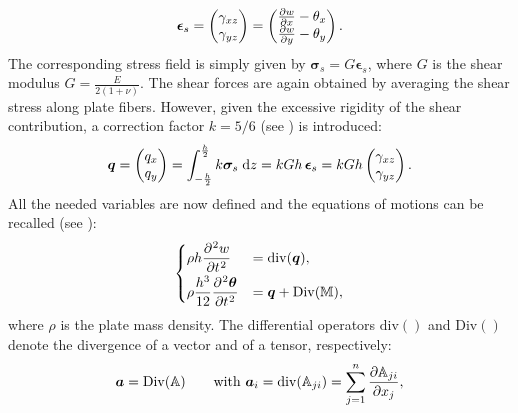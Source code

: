 \documentclass[11t]{article}
\begin{document}
{		\begin{equation}	
		\bm{\epsilon}_s = 
		\begin{pmatrix}
		\gamma_{xz} \\
		\gamma_{yz} \\
		\end{pmatrix} = 
		\begin{pmatrix}
		\diffp{w}{x} - \theta_x \\
		\diffp{w}{y} - \theta_y \\
		\end{pmatrix}.
		\end{equation}
		The corresponding stress field is simply given by $\bm\sigma_s = G \bm{\epsilon}_s$, where $G$ is the shear modulus $G = \frac{E}{2 (1 + \nu)}$. The shear forces are again obtained by averaging the shear stress along plate fibers. However, given the excessive rigidity of the shear contribution, a correction factor $k = 5/6$ (see \cite{mindlin}) is introduced:
		\begin{equation}
		\bm{q} = \begin{pmatrix}
		q_x \\
		q_y \\
		\end{pmatrix} =
		\int_{-\frac{h}{2} }^{ \frac{h}{2} } k \bm\sigma_s \d{z} = k G h \, \bm{\epsilon}_s = k G h
		\begin{pmatrix}
		\gamma_{xz} \\
		\gamma_{yz} \\
		\end{pmatrix}.
		\end{equation}
		All the needed variables are now defined and the equations of motions can be recalled (see \cite{mindlin}): 
		\begin{equation}
		\begin{cases}
		\displaystyle \rho h \diffp[2]{w}{t} &= \mathrm{div}(\bm{q}),  \vspace{1mm}\\
		\displaystyle \rho\frac{h^3}{12} \diffp[2]{\bm \theta}{t} &= \bm{q} + \mathrm{Div}(\mathbb{M}), \\
		\end{cases}
		\end{equation}
		where $\rho$ is the plate mass density. The differential operators $\mathrm{div}()$ and $\mathrm{Div}()$ denote the divergence of a vector and of a tensor, respectively:
		\begin{equation*}
		\bm{a} = \mathrm{Div}(\mathbb{A})  \qquad \text{with } \bm{a}_i = \mathrm{div}(\mathbb{A}_{ji}) = \sum_{j = 1}^n \diffp{\mathbb{A}_{ji}}{x_j},

\end{equation*}}
\end{document}

